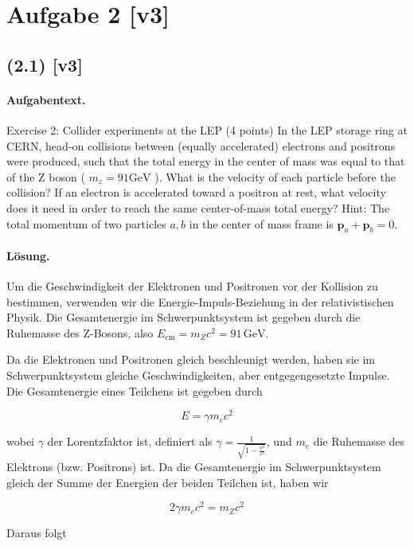 \documentclass[11pt,a4paper]{article}
\begin{document}

\section*{Aufgabe 2 [v3]}
\subsection*{(2.1) [v3]}
\paragraph{Aufgabentext.}
Exercise 2: Collider experiments at the LEP (4 points)
In the LEP storage ring at CERN, head-on collisions between (equally accelerated) electrons and positrons were produced, such that the total energy in the center of mass was equal to that of the Z boson ( $m_z=91 \mathrm{GeV}$ ). What is the velocity of each particle before the collision? If an electron is accelerated toward a positron at rest, what velocity does it need in order to reach the same center-of-mass total energy?
Hint: The total momentum of two particles $a, b$ in the center of mass frame is $\mathbf{p}_a+\mathbf{p}_b=0$.

\paragraph{Lösung.}
Um die Geschwindigkeit der Elektronen und Positronen vor der Kollision zu bestimmen, verwenden wir die Energie-Impuls-Beziehung in der relativistischen Physik. Die Gesamtenergie im Schwerpunktsystem ist gegeben durch die Ruhemasse des Z-Bosons, also \( E_{\text{cm}} = m_Z c^2 = 91 \, \text{GeV} \).

Da die Elektronen und Positronen gleich beschleunigt werden, haben sie im Schwerpunktsystem gleiche Geschwindigkeiten, aber entgegengesetzte Impulse. Die Gesamtenergie eines Teilchens ist gegeben durch

\[
E = \gamma m_e c^2
\]

wobei \(\gamma\) der Lorentzfaktor ist, definiert als \(\gamma = \frac{1}{\sqrt{1 - \frac{v^2}{c^2}}}\), und \(m_e\) die Ruhemasse des Elektrons (bzw. Positrons) ist. Da die Gesamtenergie im Schwerpunktsystem gleich der Summe der Energien der beiden Teilchen ist, haben wir

\[
2 \gamma m_e c^2 = m_Z c^2
\]

Daraus folgt
\end{document}

